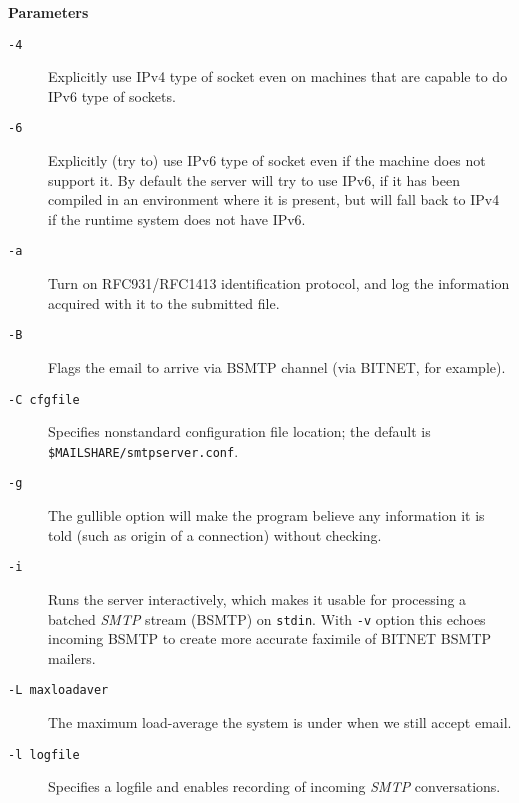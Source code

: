 {\bf Parameters}

\begin{description}
\item[{\tt -4}] \mbox{}

Explicitly use IPv4 type of socket even on machines that are capable to do IPv6 type of sockets.

\item[{\tt -6}] \mbox{}

Explicitly (try to) use IPv6 type of socket even if the machine does not support it. 
By default the server will try to use IPv6, if it has been compiled in an environment where it is present, 
but will fall back to IPv4 if the runtime system does not have IPv6.

\item[{\tt -a}] \mbox{}

Turn on RFC931/RFC1413 identification protocol, and log the information acquired with it to the 
submitted file.

\item[{\tt -B}] \mbox{}

Flags the email to arrive via BSMTP channel (via BITNET, for example).

\item[{\tt -C cfgfile}] \mbox{}

Specifies nonstandard configuration file location; the default is 
{\tt \$MAILSHARE/smtpserver.conf}.

\item[{\tt -g}] \mbox{}

The gullible option will make the program believe any information it is told 
(such as origin of a connection) without checking.

\item[{\tt -i}] \mbox{}

Runs the server interactively, which makes it usable for processing a batched 
{\em SMTP\/} stream (BSMTP) on {\tt stdin}. With {\tt -v} option this echoes incoming BSMTP to create more 
accurate faximile of BITNET BSMTP mailers.

\item[{\tt -L maxloadaver}] \mbox{}

The maximum load-average the system is under when we still accept email.

\item[{\tt -l logfile}] \mbox{}

Specifies a logfile and enables recording of incoming {\em SMTP\/} conversations.


\end{description}
